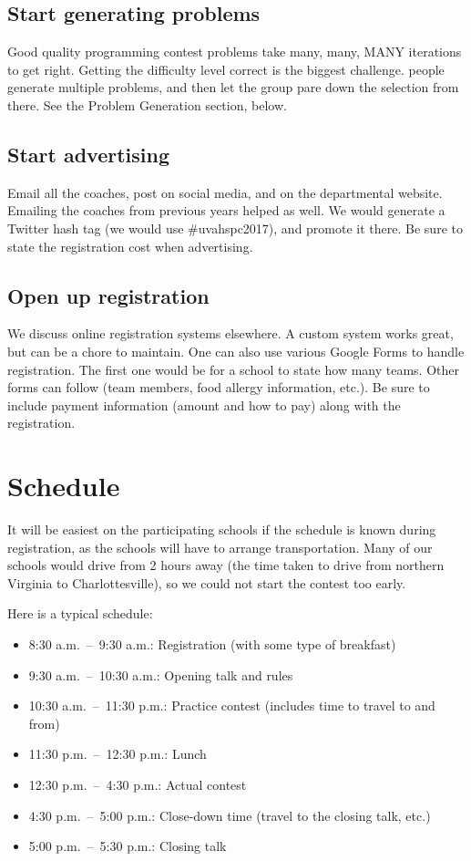 \documentclass[11pt,twoside,letterpaper]{book}
\newenvironment{itemlist}{
\begin{itemize}
\setlength{\itemsep}{0pt}
\setlength{\parskip}{0pt}}
{\end{itemize}}
\begin{document}
\subsection*{Start generating problems}

Good quality programming contest problems take many, many, MANY
iterations to get right.  Getting the difficulty level correct is the
biggest challenge.  people generate multiple problems, and then let
the group pare down the selection from there.  See the Problem
Generation section, below.


\subsection*{Start advertising}

Email all the coaches, post on social media, and on the departmental
website.  Emailing the coaches from previous years helped as well.  We
would generate a Twitter hash tag (we would use \#uvahspc2017), and
promote it there.  Be sure to state the registration cost when
advertising.


\subsection*{Open up registration}

We discuss online registration systems elsewhere.  A custom system
works great, but can be a chore to maintain.  One can also use various
Google Forms to handle registration.  The first one would be for a
school to state how many teams.  Other forms can follow (team members,
food allergy information, etc.).  Be sure to include payment
information (amount and how to pay) along with the registration.


\section{Schedule}

It will be easiest on the participating schools if the schedule is
known during registration, as the schools will have to arrange
transportation.  Many of our schools would drive from 2 hours away
(the time taken to drive from northern Virginia to Charlottesville),
so we could not start the contest too early.

Here is a typical schedule:

\begin{itemlist}
  \item 8:30 a.m.\ --\ 9:30 a.m.: Registration (with some type of
    breakfast)
  \item 9:30 a.m.\ --\ 10:30 a.m.: Opening talk and rules
  \item 10:30 a.m.\ --\ 11:30 p.m.: Practice contest (includes time to
    travel to and from)
  \item 11:30 p.m.\ --\ 12:30 p.m.: Lunch
  \item 12:30 p.m.\ --\ 4:30 p.m.: Actual contest
  \item 4:30 p.m.\ --\ 5:00 p.m.: Close-down time (travel to the
    closing talk, etc.)
  \item 5:00 p.m.\ --\ 5:30 p.m.: Closing talk
\end{itemlist}
\end{document}
